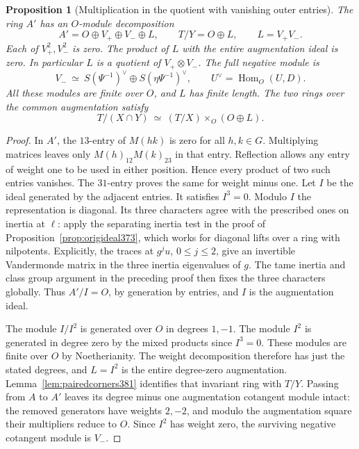 \documentclass[a4paper,11pt]{article}
\newtheorem{proposition}{Proposition}[section]
\theoremstyle{definition}
\theoremstyle{remark}
\numberwithin{equation}{section}
\begin{document}
\begin{proposition}[Multiplication in the quotient with vanishing outer entries]
\label{prop:ordinaryplane381}
The ring \(A'\) has an \(O\)-module decomposition
\[
       A'=O\oplus V_+\oplus V_-\oplus L,\qquad
       T/Y=O\oplus L,\qquad L=V_+V_- .
\]
Each of \(V_+^2,V_-^2\) is zero. The product of \(L\) with the
entire augmentation ideal is zero. In particular \(L\) is a
quotient of \(V_+\otimes V_-\). The full negative module is
\[
 V_-\ \simeq\ S(\Psi^{-1})^\vee\oplus S(\eta\Psi^{-1})^\vee,
 \qquad U^\vee=\operatorname{Hom}_O(U,D).
\]
All these modules are finite over \(O\), and \(L\) has finite
length. The two rings over the common augmentation satisfy
\[
        T/(X\cap Y)\ \simeq\ (T/X)\times_O(O\oplus L).
\]
\end{proposition}
\begin{proof}
In \(A'\), the \(13\)-entry of \(M(hk)\) is zero for all
\(h,k\in G\). Multiplying matrices leaves only
\(M(h)_{12}M(k)_{23}\) in that entry. Reflection allows any
entry of weight one to be used in either position. Hence every
product of two such entries vanishes. The \(31\)-entry proves
the same for weight minus one. Let \(I\) be the ideal generated
by the adjacent entries. It satisfies \(I^3=0\).
Modulo \(I\) the representation is diagonal. Its three
characters agree with the prescribed ones on inertia at
\(\ell\): apply the separating inertia test in the proof
of Proposition~\ref{prop:origideal373}, which works for
diagonal lifts over a ring with nilpotents. Explicitly, the
traces at \(g^j u\), \(0\le j\le2\), give an invertible
Vandermonde matrix in the three inertia eigenvalues of \(g\).
The tame inertia and class group argument in the preceding
proof then fixes the three characters globally. Thus
\(A'/I=O\), by generation by entries, and \(I\) is the
augmentation ideal.

The module \(I/I^2\) is generated over \(O\) in degrees
\(1,-1\). The module \(I^2\) is generated in degree zero by the mixed
products since \(I^3=0\). These modules are finite over \(O\)
by Noetherianity. The weight decomposition therefore has
just the stated degrees, and \(L=I^2\) is the entire
degree-zero augmentation. Lemma~\ref{lem:pairedcorners381}
identifies that invariant ring with \(T/Y\).
Passing from \(A\) to \(A'\) leaves its degree minus one
augmentation cotangent module intact: the removed generators
have weights \(2,-2\), and modulo the augmentation square
their multipliers reduce to \(O\). Since \(I^2\) has weight
zero, the surviving negative cotangent module is \(V_-\).


\end{proof}
\end{document}
